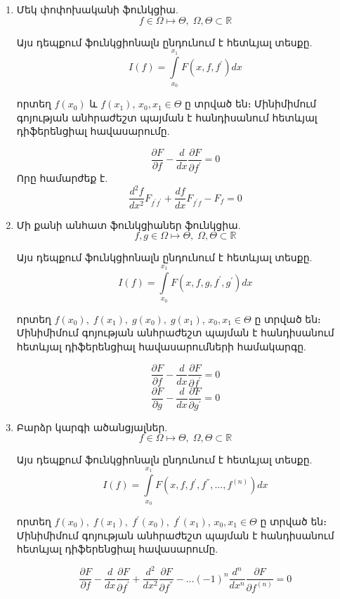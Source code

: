 \documentclass[fleqn, bachelor,subf,12pt,notitlepage]{disser}
\begin{document}
\begin{enumerate}

\item Մեկ փոփոխականի ֆունկցիա.
$$f \in \Omega \mapsto \Theta, \; \Omega, \Theta \subset \mathbb{R}$$

\noindent Այս դեպքում ֆունկցիոնալն ընդունում է հետևյալ տեսքը.
$$I\left(f\right) = \int\limits_{x_0}^{x_{1}} F\left(x, f, f^{'}\right)dx$$

\noindent որտեղ $f(x_{0})$ և $f(x_{1})$, $x_{0}, x_{1} \in \Theta$ ը տրված են։
\noindent Մինիմիմում գոյության անհրաժեշտ պայման է հանդիսանում հետևյալ դիֆերենցիալ հավասարումը.

$$\dfrac{\partial F}{\partial f} - \dfrac{d}{dx}\dfrac{\partial F}{\partial f^{'}}=0$$
Որը համարժեք է.
$$\dfrac{d^{2}f}{dx^{2}}F_{f^{'}f^{'}}+\dfrac{df}{dx}F_{f^{'}f}-F_{f}=0$$

\item Մի քանի անհատ ֆունկցիաներ ֆունկցիա.
$$f,g \in \Omega \mapsto \Theta, \; \Omega, \Theta \subset \mathbb{R}$$

\noindent Այս դեպքում ֆունկցիոնալն ընդունում է հետևյալ տեսքը.
$$I\left(f\right) = \int\limits_{x_0}^{x_{1}} F\left(x, f, g, f^{'}, g^{'}\right)dx$$

\noindent որտեղ $f(x_{0}), \; f(x_{1}), \; g(x_{0}), \; g(x_{1})$, $x_{0}, x_{1} \in \Theta$ ը տրված են։
\noindent Մինիմիմում գոյության անհրաժեշտ պայման է հանդիսանում հետևյալ դիֆերենցիալ հավասարումների համակարգը.

$$\dfrac{\partial F}{\partial f} - \dfrac{d}{dx}\dfrac{\partial F}{\partial f^{'}}=0$$
$$\dfrac{\partial F}{\partial g} - \dfrac{d}{dx}\dfrac{\partial F}{\partial g^{'}}=0$$

\item Բարձր կարգի ածանցյալներ.
$$f \in \Omega \mapsto \Theta, \; \Omega, \Theta \subset \mathbb{R}$$

\noindent Այս դեպքում ֆունկցիոնալն ընդունում է հետևյալ տեսքը.
$$I\left(f\right) = \int\limits_{x_0}^{x_{1}} F\left(x, f, f^{'}, f^{''}, \dots, f^{(n)}\right)dx$$

\noindent որտեղ $f(x_{0}), \; f(x_{1}), \; f^{'}(x_{0}), \; f^{'}(x_{1})$, $x_{0}, x_{1} \in \Theta$ ը տրված են։
\noindent Մինիմիմում գոյության անհրաժեշտ պայման է հանդիսանում հետևյալ դիֆերենցիալ հավասարումը.

$$\dfrac{\partial F}{\partial f} - \dfrac{d}{dx}\dfrac{\partial F}{\partial f^{'}} + \dfrac{d^{2}}{dx^{2}}\dfrac{\partial F}{\partial f^{''}} - \dots (-1)^{n}\dfrac{d^{n}}{dx^{n}}\dfrac{\partial F}{\partial f^{(n)}}=0$$



\end{enumerate}
\end{document}
